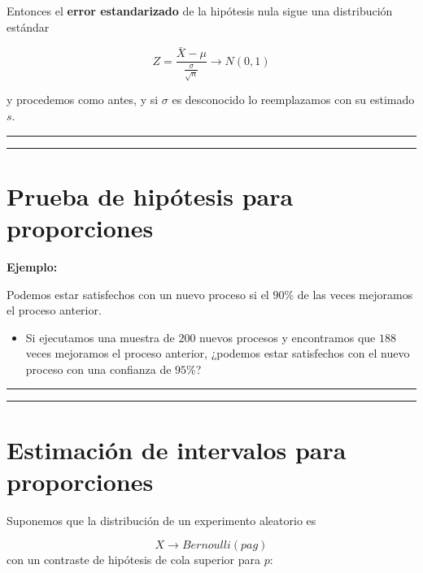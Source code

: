 \documentclass[
]{book}
\providecommand{\tightlist}{%
  \setlength{\itemsep}{0pt}\setlength{\parskip}{0pt}}
\begin{document}
Entonces el \textbf{error estandarizado} de la hipótesis nula sigue una distribución estándar

\[Z=\frac{\bar{X}-\mu}{\frac{\sigma}{\sqrt{n}}} \rightarrow N(0,1)\]

y procedemos como antes, y si \(\sigma\) es desconocido lo reemplazamos con su estimado \(s\).

\begin{center}\rule{0.5\linewidth}{0.5pt}\end{center}

\begin{center}\rule{0.5\linewidth}{0.5pt}\end{center}

\hypertarget{prueba-de-hipuxf3tesis-para-proporciones}{%
\section{Prueba de hipótesis para proporciones}\label{prueba-de-hipuxf3tesis-para-proporciones}}

\textbf{Ejemplo:}

Podemos estar satisfechos con un nuevo proceso si el \(90\%\) de las veces mejoramos el proceso anterior.

\begin{itemize}
\tightlist
\item
  Si ejecutamos una muestra de \(200\) nuevos procesos y encontramos que \(188\) veces mejoramos el proceso anterior, ¿podemos estar satisfechos con el nuevo proceso con una confianza de \(95\%\)?
\end{itemize}

\begin{center}\rule{0.5\linewidth}{0.5pt}\end{center}

\begin{center}\rule{0.5\linewidth}{0.5pt}\end{center}

\hypertarget{estimaciuxf3n-de-intervalos-para-proporciones}{%
\section{Estimación de intervalos para proporciones}\label{estimaciuxf3n-de-intervalos-para-proporciones}}

Suponemos que la distribución de un experimento aleatorio es

\[X \rightarrow Bernoulli (pag)\]
con un contraste de hipótesis de cola superior para \(p\):
\end{document}
